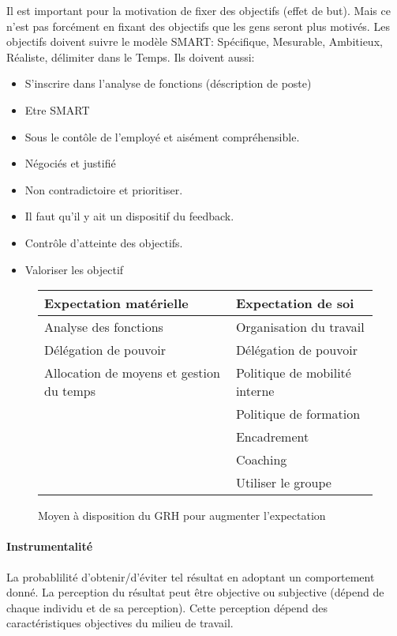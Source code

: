 \documentclass[11pt]{article} %
\begin{document}
Il est important pour la motivation de fixer des objectifs (effet de but). Mais ce n'est pas forcément en fixant des objectifs que les gens seront plus motivés. Les objectifs doivent suivre le modèle SMART:
 Spécifique, Mesurable, Ambitieux, Réaliste, délimiter dans le Temps. Ils doivent aussi:
 \begin{multicols}{2}
	\begin{itemize}
		\item S'inscrire dans l'analyse de fonctions (déscription de poste)
		\item Etre SMART
		\item Sous le contôle de l'employé et aisément compréhensible.
		\item Négociés et justifié
		\item Non contradictoire et prioritiser.
		\item Il faut qu'il y ait un dispositif du feedback.
		\item Contrôle d'atteinte des objectifs.
		\item Valoriser les objectif
	\end{itemize}
 \end{multicols}

\begin{figure}[H]
\centering
\begin{tabular}{|l|l|}
	\hline
	\textbf{Expectation matérielle} & \textbf{Expectation de soi} \\
	\hline
	Analyse des fonctions & Organisation du travail\\
	Délégation de pouvoir & Délégation de pouvoir \\
	Allocation de moyens et gestion du temps & Politique de mobilité interne\\
	& Politique de formation\\
	& Encadrement\\
	& Coaching\\
	& Utiliser le groupe\\
	\hline
\end{tabular}
\caption{Moyen à disposition du GRH pour augmenter l'expectation}
\end{figure}
 
 \paragraph{Instrumentalité} La probablilité d'obtenir/d'éviter tel résultat en adoptant un
 comportement donné. La perception du résultat peut être objective ou subjective (dépend de chaque 
 individu et de sa perception). Cette perception dépend des caractéristiques objectives du milieu de 
 travail.
\end{document}
